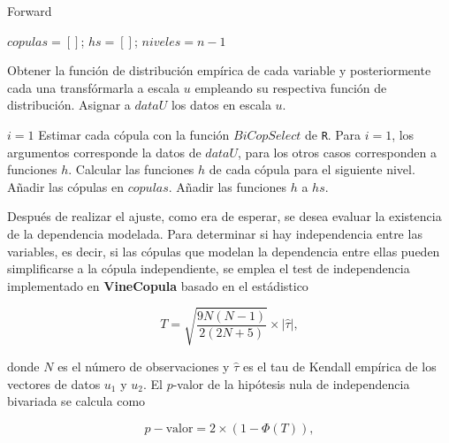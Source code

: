 \begin{algorithm}[H]
      \caption{Forward}
      \label{algfordward}
      \begin{algorithmic}[1]  

        \State $copulas =  \left [  \right ]$; $hs =  \left [  \right ]$; $niveles = n-1$
        
        \State Obtener la función de distribución empírica de cada variable y posteriormente cada una transfórmarla a escala $u$ empleando su respectiva función de distribución. 
        \State Asignar a $dataU$ los datos en escala $u$.
        
        \State $i = 1$
          \State Estimar cada cópula con la función $BiCopSelect$ de \texttt{R}. Para $i = 1$, los argumentos corresponde la datos de $dataU$, para los otros casos corresponden a funciones $h$.
          \State Calcular las funciones $h$ de cada cópula para el siguiente nivel.
          \State Añadir las cópulas en $copulas$.
          \State Añadir las funciones $h$ a $hs$.
        \EndWhile
       
      \end{algorithmic}
    \end{algorithm}



Después de realizar el ajuste, como era de esperar, se desea evaluar la existencia de la dependencia modelada. Para determinar si hay independencia entre las variables, es decir, si las cópulas que modelan la dependencia entre ellas pueden simplificarse a la cópula independiente, se emplea el test de independencia implementado en \textbf{VineCopula} basado en el estádistico
    
\begin{equation}\label{T}
    T = \sqrt{\frac{9N(N - 1)}{2(2N + 5)}} \times |\hat{\tau}|,
\end{equation}

donde $N$ es el número de observaciones y $\hat{\tau}$ es el tau de Kendall empírica de los vectores de datos $u_1$ y $u_2$. El $p$-valor de la hipótesis nula de independencia bivariada se calcula como

\begin{equation}
    p-\text{valor} = 2 \times \left(1 - \Phi\left(T\right)\right),
\end{equation}


